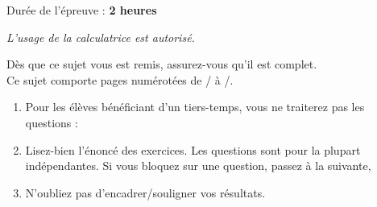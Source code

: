 \begin{center}
    \begin{large}
        Durée de l'épreuve : \textbf{2 heures}\\
    \end{large}
\end{center}
\vspace{1cm}
\begin{center}
    \begin{large}
        \textit{L'usage de la calculatrice est autorisé.}\\
    \end{large}
\end{center}
\vspace{1cm}
\begin{center}
    \begin{large}
        Dès que ce sujet vous est remis, assurez-vous qu’il est complet.\\
        Ce sujet comporte \pageref{LastPage} pages numérotées de \thepage/\pageref{LastPage} à \pageref{LastPage}/\pageref{LastPage}.
    \end{large}
\end{center}

\begin{tcolorbox}[colback=red!5!white,colframe=red!75!black,title=\textbf{Consignes : }]
   \begin{enumerate}
       \item Pour les élèves bénéficiant d'un tiers-temps, vous ne traiterez pas les questions : 
       \item Lisez-bien l'énoncé des exercices. Les questions sont pour la plupart indépendantes. Si vous bloquez sur une question, passez à la suivante,
       \item N'oubliez pas d'encadrer/souligner vos résultats.
   \end{enumerate}
\end{tcolorbox}
\newpage




